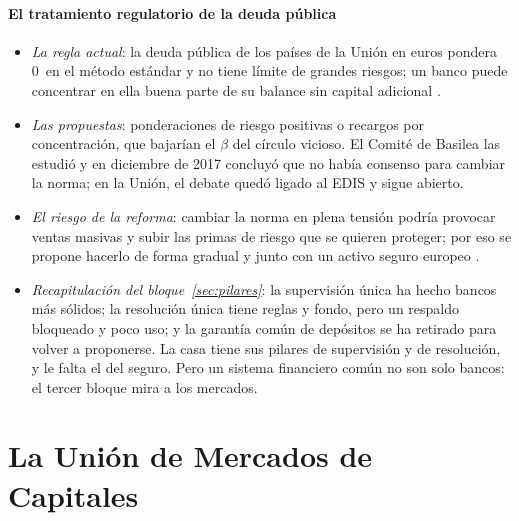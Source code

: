 \documentclass[11pt]{article}
\begin{document}
\paragraph{El tratamiento regulatorio de la deuda pública}

\begin{itemize}
\item \emph{La regla actual}: la deuda pública de los países de la Unión en euros pondera 0~en el método estándar y no tiene límite de grandes riesgos; un banco puede concentrar en ella buena parte de su balance sin capital adicional .
\item \emph{Las propuestas}: ponderaciones de riesgo positivas o recargos por concentración, que bajarían el $\beta$ del círculo vicioso. El Comité de Basilea las estudió y en diciembre de 2017 concluyó que no había consenso para cambiar la norma\nocite{BCBS2017Soberanos}; en la Unión, el debate quedó ligado al EDIS y sigue abierto.
\item \emph{El riesgo de la reforma}: cambiar la norma en plena tensión podría provocar ventas masivas y subir las primas de riesgo que se quieren proteger; por eso se propone hacerlo de forma gradual y junto con un activo seguro europeo .
\end{itemize}

\begin{itemize}
\item \emph{Recapitulación del bloque~\ref{sec:pilares}}: la supervisión única ha hecho bancos más sólidos; la resolución única tiene reglas y fondo, pero un respaldo bloqueado y poco uso; y la garantía común de depósitos se ha retirado para volver a proponerse. La casa tiene sus pilares de supervisión y de resolución, y le falta el del seguro. Pero un sistema financiero común no son solo bancos: el tercer bloque mira a los mercados.
\end{itemize}

\section{La Unión de Mercados de Capitales}\label{sec:umc}
\end{document}
